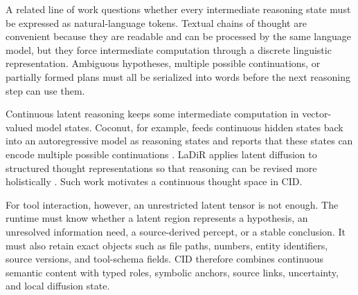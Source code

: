 A related line of work questions whether every intermediate reasoning state must be expressed as natural-language tokens. Textual chains of thought are convenient because they are readable and can be processed by the same language model, but they force intermediate computation through a discrete linguistic representation. Ambiguous hypotheses, multiple possible continuations, or partially formed plans must all be serialized into words before the next reasoning step can use them.

Continuous latent reasoning keeps some intermediate computation in vector-valued model states. Coconut, for example, feeds continuous hidden states back into an autoregressive model as reasoning states and reports that these states can encode multiple possible continuations \citep{hao2024coconut}. LaDiR applies latent diffusion to structured thought representations so that reasoning can be revised more holistically \citep{kang2025ladir}. Such work motivates a continuous thought space in CID.

For tool interaction, however, an unrestricted latent tensor is not enough. The runtime must know whether a latent region represents a hypothesis, an unresolved information need, a source-derived percept, or a stable conclusion. It must also retain exact objects such as file paths, numbers, entity identifiers, source versions, and tool-schema fields. CID therefore combines continuous semantic content with typed roles, symbolic anchors, source links, uncertainty, and local diffusion state.

